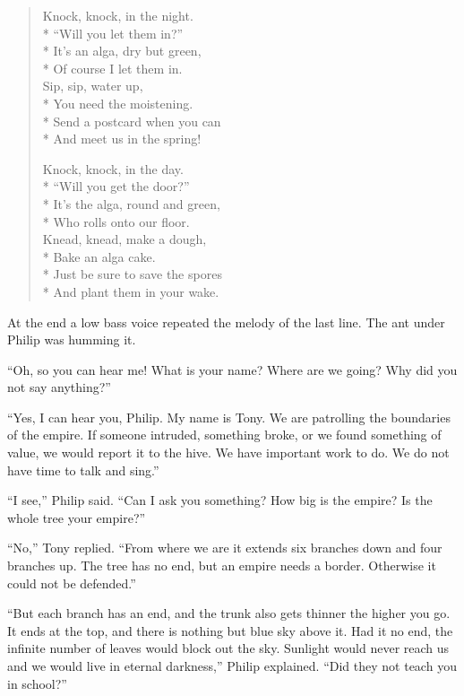 \documentclass[10pt]{memoir}
\begin{document}
\begin{verse}

Knock, knock, in the night. \\*
\vin ``Will you let them in?'' \\*
It's an alga, dry but green, \\*
\vin Of course I let them in. \\
Sip, sip, water up, \\*
\vin You need the moistening. \\*
Send a postcard when you can \\*
\vin And meet us in the spring!

Knock, knock, in the day. \\*
\vin ``Will you get the door?'' \\*
It's the alga, round and green, \\*
\vin Who rolls onto our floor. \\
Knead, knead, make a dough, \\*
\vin Bake an alga cake. \\*
Just be sure to save the spores \\*
\vin And plant them in your wake.

\end{verse}


At the end a low bass voice repeated the melody of the last line. The ant under
Philip was humming it.

``Oh, so you can hear me! What is your name? Where are we going? Why did you
not say anything?''

``Yes, I can hear you, Philip. My name is Tony. We are patrolling the
boundaries of the empire. If someone intruded, something broke, or we found
something of value, we would report it to the hive. We have important work to
do. We do not have time to talk and sing.''

``I see,'' Philip said. ``Can I ask you something? How big is the empire? Is
the whole tree your empire?''

``No,'' Tony replied. ``From where we are it extends six branches down and four
branches up. The tree has no end, but an empire needs a border. Otherwise it
could not be defended.''

``But each branch has an end, and the trunk also gets thinner the higher you
go. It ends at the top, and there is nothing but blue sky above it. Had it no
end, the infinite number of leaves would block out the sky. Sunlight would
never reach us and we would live in eternal darkness,'' Philip explained. ``Did
they not teach you in school?''
\end{document}
